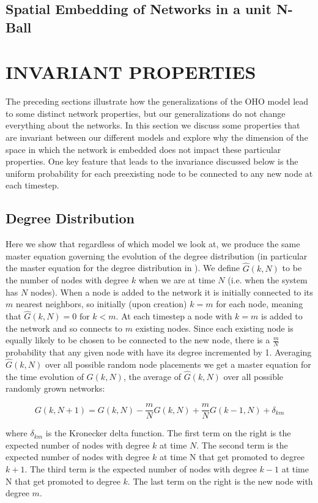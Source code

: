 \documentclass[aps,pre,reprint,superscriptaddress,amsmath,amssymb]{revtex4-1}
\begin{document}
\subsection{Spatial Embedding of Networks in a unit N-Ball}


\section{INVARIANT PROPERTIES}
The preceding sections illustrate how the generalizations of the OHO model lead to some distinct network properties, but our generalizations do not change everything about the networks.
In this section we discuss some properties that are invariant between our different models and explore why the dimension of the space in which the network is embedded does not impact these particular properties.
One key feature that leads to the invariance discussed below is the uniform probability for each preexisting node to be connected to any new node at each timestep. 

\subsection{Degree Distribution}
Here we show that regardless of which model we look at, we produce the same master equation governing the evolution of the degree distribution (in particular the master equation for the degree distribution in \cite{ozik2004}).
We define $\hat{G}(k,N)$ to be the number of nodes with degree $k$ when we are at time $N$ (i.e. when the system has $N$ nodes).
When a node is added to the network it is initially connected to its $m$ nearest neighbors, so initially (upon creation) $k = m$ for each node, meaning that $\hat{G}(k,N) = 0 \text{ for } k < m$.
At each timestep a node with $k = m$ is added to the network and so connects to $m$ existing nodes.
Since each existing node is equally likely to be chosen to be connected to the new node, there is a $\frac{m}{N}$ probability that any given node with have its degree incremented by 1.
Averaging $\hat{G}(k,N)$ over all possible random node placements we get a master equation for the time evolution of $G(k,N)$, the average of $\hat{G}(k,N)$ over all possible randomly grown networks:

\[G(k,N+1) = G(k,N) - \frac{m}{N}G(k,N) + \frac{m}{N}G(k-1,N) + \delta_{km}\]

where $\delta_{km}$ is the Kronecker delta function.
The first term on the right is the expected number of nodes with degree $k$ at time $N$.
The second term is the expected number of nodes with degree $k$ at time N that get promoted to degree $k+1$.
The third term is the expected number of nodes with degree $k-1$ at time N that get promoted to degree $k$.
The last term on the right is the new node with degree $m$.
\end{document}
